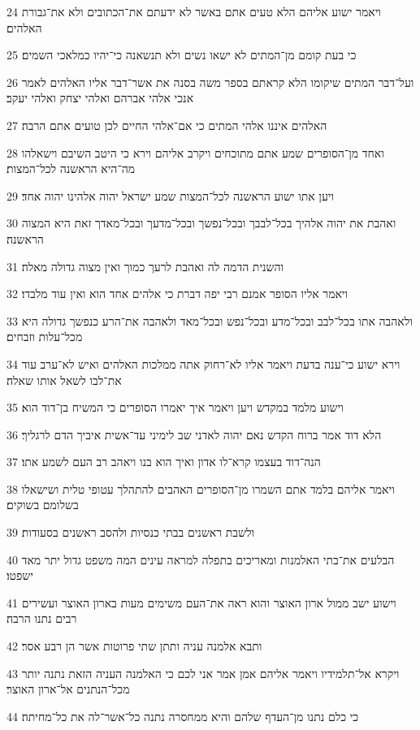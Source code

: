 \par 24 ויאמר ישוע אליהם הלא טעים אתם באשר לא ידעתם את־הכתובים ולא את־גבורת האלהים׃
\par 25 כי בעת קומם מן־המתים לא ישאו נשים ולא תנשאנה כי־יהיו כמלאכי השמים׃
\par 26 ועל־דבר המתים שיקומו הלא קראתם בספר משה בסנה את אשר־דבר אליו האלהים לאמר אנכי אלהי אברהם ואלהי יצחק ואלהי יעקב׃
\par 27 האלהים איננו אלהי המתים כי אם־אלהי החיים לכן טועים אתם הרבה׃
\par 28 ואחד מן־הסופרים שמע אתם מתוכחים ויקרב אליהם וירא כי היטב השיבם וישאלהו מה־היא הראשנה לכל־המצות׃
\par 29 ויען אתו ישוע הראשנה לכל־המצות שמע ישראל יהוה אלהינו יהוה אחד׃
\par 30 ואהבת את יהוה אלהיך בכל־לבבך ובכל־נפשך ובכל־מדעך ובכל־מאדך זאת היא המצוה הראשנה׃
\par 31 והשנית הדמה לה ואהבת לרעך כמוך ואין מצוה גדולה מאלה׃
\par 32 ויאמר אליו הסופר אמנם רבי יפה דברת כי אלהים אחד הוא ואין עוד מלבדו׃
\par 33 ולאהבה אתו בכל־לבב ובכל־מדע ובכל־נפש ובכל־מאד ולאהבה את־הרע כנפשך גדולה היא מכל־עלות וזבחים׃
\par 34 וירא ישוע כי־ענה בדעת ויאמר אליו לא־רחוק אתה ממלכות האלהים ואיש לא־ערב עוד את־לבו לשאל אותו שאלה׃
\par 35 וישוע מלמד במקדש ויען ויאמר איך יאמרו הסופרים כי המשיח בן־דוד הוא׃
\par 36 הלא דוד אמר ברוח הקדש נאם יהוה לאדני שב לימיני עד־אשית איביך הדם לרגליך׃
\par 37 הנה־דוד בעצמו קרא־לו אדון ואיך הוא בנו ויאהב רב העם לשמע אתו׃
\par 38 ויאמר אליהם בלמד אתם השמרו מן־הסופרים האהבים להתהלך עטופי טלית ושישאלו בשלומם בשוקים׃
\par 39 ולשבת ראשנים בבתי כנסיות ולהסב ראשנים בסעודות׃
\par 40 הבלעים את־בתי האלמנות ומאריכים בתפלה למראה עינים המה משפט גדול יתר מאד ישפטו׃
\par 41 וישוע ישב ממול ארון האוצר והוא ראה את־העם משימים מעות בארון האוצר ועשירים רבים נתנו הרבה׃
\par 42 ותבא אלמנה עניה ותתן שתי פרוטות אשר הן רבע אסר׃
\par 43 ויקרא אל־תלמידיו ויאמר אליהם אמן אמר אני לכם כי האלמנה העניה הזאת נתנה יותר מכל־הנתנים אל־ארון האוצר׃
\par 44 כי כלם נתנו מן־העדף שלהם והיא ממחסרה נתנה כל־אשר־לה את כל־מחיתה׃

